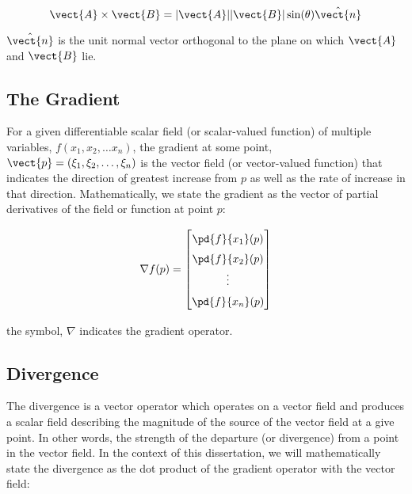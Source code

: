 \begin{equation}
    \label{eqn:crossproduct}
    \vect{A} \times \vect{B} = |\vect{A}||\vect{B}| \sin (\theta) \hat{\vect{n}}
\end{equation}

\where \(\hat{\vect{n}}\) is the unit normal vector orthogonal to the plane on which \(\vect{A}\) and \(\vect{B}\) lie.


\subsection{The Gradient}

For a given differentiable scalar field (or scalar-valued function) of multiple variables, \(f(x_1, x_2, \ldots x_n)\), the gradient at some point, \(\vect{p} = (\xi_1, \xi_2, \ldots, \xi_n)\) is the vector field (or vector-valued function) that indicates the direction of greatest increase from \(p\) as well as the rate of increase in that direction.
%
Mathematically, we state the gradient as the vector of partial derivatives of the field or function at point \(p\):

\begin{equation}
    \label{eqn:gradient}
    \begingroup
    \renewcommand*{\arraystretch}{1.5}
    \nabla f(p) =
    \begin{bmatrix}
    \pd{f}{x_1}(p) \\
    \pd{f}{x_2}(p) \\
    \vdots \\
    \pd{f}{x_n}(p) \\
    \end{bmatrix}
    \endgroup
\end{equation}

\where the symbol, \(\nabla\) indicates the gradient operator.

\subsection{Divergence}

The divergence is a vector operator which operates on a vector field and produces a scalar field describing the magnitude of the source of the vector field at a give point.
%
In other words, the strength of the departure (or divergence) from a point in the vector field.
%
In the context of this dissertation, we will mathematically state the divergence as the dot product of the gradient operator with the vector field:

